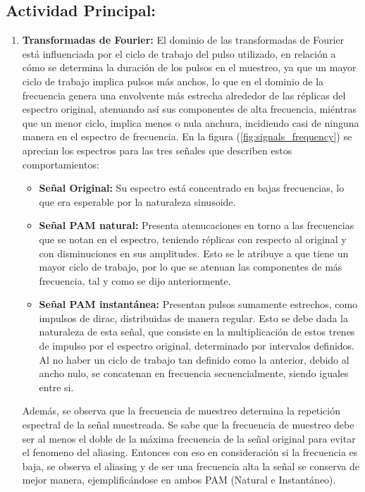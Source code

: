 \documentclass[12pt]{article}
\begin{document}
\subsection{Actividad Principal: }
\begin{enumerate}

    \item \textbf{Transformadas de Fourier:} El dominio de las transformadas de Fourier está influenciada por el ciclo de trabajo del pulso utilizado, en relación a cómo se determina la duración de los pulsos en el muestreo, ya que un mayor ciclo de trabajo implica pulsos más anchos, lo que en el dominio de la frecuencia genera una envolvente más estrecha alrededor de las réplicas del espectro original, atenuando así sus componentes de alta frecuencia, miéntras que un menor ciclo, implica menos o nula anchura, incidiendo casi de ninguna manera en el espectro de frecuencia. En la figura (\ref{fig:signals_frequency}) se aprecian los espectros para las tres señales que describen estos comportamientos:
    
    \begin{itemize}
        \item \textbf{Señal Original:} Su espectro está concentrado en bajas frecuencias, lo que era esperable por la naturaleza sinusoide.
        \item \textbf{Señal PAM natural:} Presenta atenucaciones en torno a las frecuencias que se notan en el espectro, teniendo réplicas con respecto al original y con disminuciones en sus amplitudes. Esto se le atribuye a que tiene un mayor ciclo de trabajo, por lo que se atenuan las componentes de más frecuencia, tal y como se dijo anteriormente.
        \item \textbf{Señal PAM instantánea:} Presentan pulsos sumamente estrechos, como impulsos de dirac, distribuidas de manera regular. Esto se debe dada la naturaleza de esta señal, que consiste en la multiplicación de estos trenes de impulso por el espectro original, determinado por intervalos definidos. Al no haber un ciclo de trabajo tan definido como la anterior, debido al ancho nulo, se concatenan en frecuencia secuencialmente, siendo iguales entre si.
    \end{itemize}

    Además, se observa que la frecuencia de muestreo determina la repetición espectral de la señal muestreada. Se sabe que la frecuencia de muestreo debe ser al menos el doble de la máxima frecuencia de la señal original para evitar el fenomeno del aliasing. Entonces con eso en consideración si la frecuencia es baja, se observa el aliasing y de ser una frecuencia alta la señal se conserva de mejor manera, ejemplificándose en ambos PAM (Natural e Instantáneo).


\end{enumerate}
\end{document}
